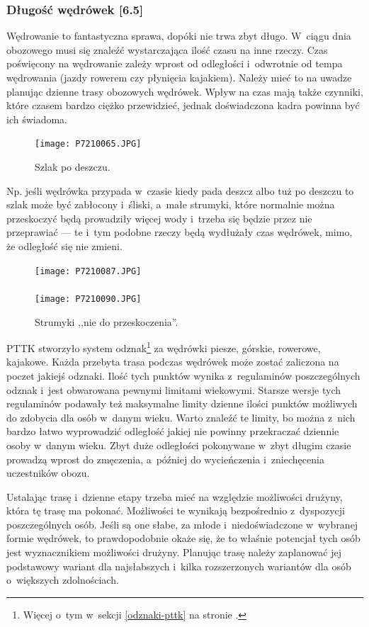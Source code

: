 \documentclass[a5paper,10pt,titlepage,twoside]{article}
\begin{document}
\subsubsection{Długość wędrówek [6.5] \label{dlugosc-wedrowek}}
Wędrowanie to fantastyczna sprawa, dopóki nie trwa zbyt długo. W~ciągu dnia obozowego musi się znaleźć wystarczająca ilość czasu na inne rzeczy. Czas poświęcony na wędrowanie zależy wprost od odległości i~odwrotnie od tempa wędrowania (jazdy rowerem czy płynięcia kajakiem). Należy mieć to na uwadze planując dzienne trasy obozowych wędrówek. Wpływ na czas mają także czynniki, które czasem bardzo ciężko przewidzieć, jednak doświadczona kadra powinna być ich świadoma.
\begin{figure}[htp]
\centering
\texttt{[image: P7210065.JPG]}
\caption{Szlak po deszczu.}\label{fig:szlakpodeszczu}
\end{figure}
Np. jeśli wędrówka przypada w~czasie kiedy pada deszcz albo tuż po deszczu to szlak może być zabłocony i~śliski, a~małe strumyki, które normalnie można przeskoczyć będą prowadziły więcej wody i~trzeba się będzie przez nie przeprawiać --- te i~tym podobne rzeczy będą wydłużały czas wędrówek, mimo, że odległość się nie zmieni.
\begin{figure}[htp]
\centering
\texttt{[image: P7210087.JPG]}\\
~~~~~~~~\\
\texttt{[image: P7210090.JPG]}
\caption{Strumyki ,,nie do przeskoczenia''.}\label{fig:przeprawa}
\end{figure}

PTTK stworzyło system odznak\footnote{Więcej o~tym w~sekcji \ref{odznaki-pttk} na stronie \pageref{odznaki-pttk}.} za wędrówki piesze, górskie, rowerowe, kajakowe. Każda przebyta trasa podczas wędrówek może zostać zaliczona na poczet jakiejś odznaki. Ilość tych punktów wynika z~regulaminów poszczególnych odznak i~jest obwarowana pewnymi limitami wiekowymi. Starsze wersje tych regulaminów podawały też maksymalne limity dzienne ilości punktów możliwych do zdobycia dla osób w~danym wieku. Warto znaleźć te limity, bo można z~nich bardzo łatwo wyprowadzić odległość jakiej nie powinny przekraczać dziennie osoby w~danym wieku. Zbyt duże odległości pokonywane w~zbyt długim czasie prowadzą wprost do zmęczenia, a~później do wycieńczenia i~zniechęcenia uczestników obozu.

Ustalając trasę i~dzienne etapy trzeba mieć na względzie możliwości drużyny, która tę trasę ma pokonać. Możliwości te wynikają bezpośrednio z~dyspozycji poszczególnych osób. Jeśli są one słabe, za młode i~niedoświadczone w~wybranej formie wędrówek, to prawdopodobnie okaże się, że to właśnie potencjał tych osób jest wyznacznikiem możliwości drużyny. Planując trasę należy zaplanować jej podstawowy wariant dla najsłabszych i~kilka rozszerzonych wariantów dla osób o~większych zdolnościach.
\end{document}
